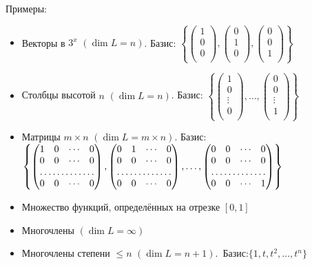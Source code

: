 Примеры:
\begin{itemize}
	\item Векторы в $3^x$ $(\dim L = n)$. Базис: $\left\{\left(\begin{array}{c} %
	1\\  
	0\\
	0\\
	\end{array}\right),\left(\begin{array}{c}
	0\\  
	1\\
	0\\
	\end{array}\right),\left(\begin{array}{c}
	0\\  
	0\\
	1\\
	\end{array}\right)\right\}$
	\item Столбцы высотой $n$ $(\dim L = n)$. Базис: $\left\{\left(\begin{array}{c}
	1\\  
	0\\
	\vdots\\
	0\\
	\end{array}\right),\ldots,\left(\begin{array}{c}
	0\\
	0\\
	\vdots\\
	1\\
	\end{array}\right)\right\}$
	\item Матрицы $m\times n$ $(\dim L =m\times n)$. Базис: $\left\{\begin{pmatrix*}[r]
	1 & 0 & \cdots & 0 \\  
	0 & 0 & \cdots & 0 \\    
	\hdotsfor{4} \\
	0 & 0 & \cdots & 0
	\end{pmatrix*},\begin{pmatrix*}[r]
	0 & 1 & \cdots & 0 \\  
	0 & 0 & \cdots & 0 \\       
	\hdotsfor{4} \\
	0 & 0 & \cdots & 0
	\end{pmatrix*},\dots,\begin{pmatrix*}[r]
	0 & 0 & \cdots & 0 \\  
	0 & 0 & \cdots & 0 \\       
	\hdotsfor{4} \\
	0 & 0 & \cdots & 1
	\end{pmatrix*}\right\}$
	\item Множество функций, определённых на отрезке $[0,1]$ %
	\item Многочлены $(\dim L = \infty)$
	\item Многочлены степени $\leq n$ $(\dim L = n+1)$.~Базис:$\{1, t, t^2, \dots,  t^n\}$ %
\end{itemize}

